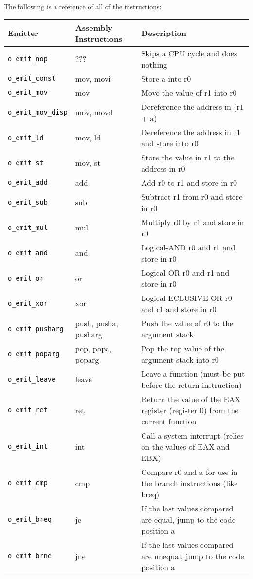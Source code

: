 \documentclass[10pt,a4paper]{article}
\begin{document}
The following is a reference of all of the instructions:

{\footnotesize
\begin{tabular}{l l p{10cm}}
\hline
Emitter & Assembly Instructions & Description \\
\hline
\verb|o_emit_nop| & ??? & Skips a CPU cycle and does nothing \\
\verb|o_emit_const| & mov, movi & Store a into r0 \\
\verb|o_emit_mov| & mov & Move the value of r1 into r0 \\
\verb|o_emit_mov_disp| & mov, movd & Dereference the address in (r1 + a) \\
\verb|o_emit_ld| & mov, ld & Dereference the address in r1 and store into r0 \\
\verb|o_emit_st| & mov, st & Store the value in r1 to the address in r0 \\
\verb|o_emit_add| & add & Add r0 to r1 and store in r0 \\
\verb|o_emit_sub| & sub & Subtract r1 from r0 and store in r0 \\
\verb|o_emit_mul| & mul & Multiply r0 by r1 and store in r0 \\
\verb|o_emit_and| & and & Logical-AND r0 and r1 and store in r0 \\
\verb|o_emit_or| & or & Logical-OR r0 and r1 and store in r0 \\
\verb|o_emit_xor| & xor & Logical-ECLUSIVE-OR r0 and r1 and store in r0 \\
\verb|o_emit_pusharg| & push, pusha, pusharg & Push the value of r0 to the argument stack \\
\verb|o_emit_poparg| & pop, popa, poparg & Pop the top value of the argument stack into r0 \\
\verb|o_emit_leave| & leave & Leave a function (must be put before the return instruction) \\
\verb|o_emit_ret| & ret & Return the value of the EAX register (register 0) from the current function \\
\verb|o_emit_int| & int & Call a system interrupt (relies on the values of EAX and EBX) \\
\verb|o_emit_cmp| & cmp & Compare r0 and a for use in the branch instructions (like breq) \\
\verb|o_emit_breq| & je & If the last values compared are equal, jump to the code position a \\
\verb|o_emit_brne| & jne & If the last values compared are unequal, jump to the code position a \\

\end{tabular}}
\end{document}
